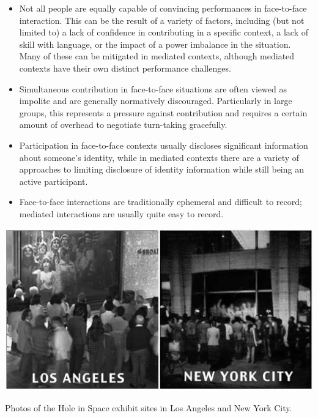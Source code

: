 \begin{itemize}
\item Not all people are equally capable of convincing performances in face-to-face interaction. This can be the result of a variety of factors, including (but not limited to) a lack of confidence in contributing in a specific context, a lack of skill with language, or the impact of a power imbalance in the situation. Many of these can be mitigated in mediated contexts\citep{Siegel:1986ve}, although mediated contexts have their own distinct performance challenges.
\item Simultaneous contribution in face-to-face situations are often viewed as impolite and are generally normatively discouraged. Particularly in large groups, this represents a pressure against contribution and requires a certain amount of overhead to negotiate turn-taking gracefully.
\item Participation in face-to-face contexts usually discloses significant information about someone's identity, while in mediated contexts there are a variety of approaches to limiting disclosure of identity information while still being an active participant.
\item Face-to-face interactions are traditionally ephemeral and difficult to record; mediated interactions are usually quite easy to record. 
\end{itemize}




\begin{marginfigure}
	\includegraphics{figures/hole_in_space.jpg}
	\caption{Photos of the Hole in Space exhibit sites in Los Angeles and New York City.}
	\label{fig:hole-in-space}
\end{marginfigure}

